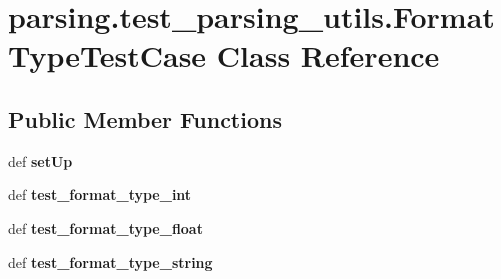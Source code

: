 \hypertarget{classparsing_1_1test__parsing__utils_1_1_format_type_test_case}{\section{parsing.\-test\-\_\-parsing\-\_\-utils.\-Format\-Type\-Test\-Case \-Class \-Reference}
\label{classparsing_1_1test__parsing__utils_1_1_format_type_test_case}
}
\subsection*{\-Public \-Member \-Functions}
\begin{DoxyCompactItemize}
\item 
\hypertarget{classparsing_1_1test__parsing__utils_1_1_format_type_test_case_a6be1e74faa339a45774884b5d8eddc33}{def {\bfseries set\-Up}}\label{classparsing_1_1test__parsing__utils_1_1_format_type_test_case_a6be1e74faa339a45774884b5d8eddc33}

\item 
\hypertarget{classparsing_1_1test__parsing__utils_1_1_format_type_test_case_ae197beff11e5da078f3f8632f9a9c687}{def {\bfseries test\-\_\-format\-\_\-type\-\_\-int}}\label{classparsing_1_1test__parsing__utils_1_1_format_type_test_case_ae197beff11e5da078f3f8632f9a9c687}

\item 
\hypertarget{classparsing_1_1test__parsing__utils_1_1_format_type_test_case_a1332766400630edd2a72aff163f0236d}{def {\bfseries test\-\_\-format\-\_\-type\-\_\-float}}\label{classparsing_1_1test__parsing__utils_1_1_format_type_test_case_a1332766400630edd2a72aff163f0236d}

\item 
\hypertarget{classparsing_1_1test__parsing__utils_1_1_format_type_test_case_afb4c837b8f17d75fc35b163e0644e6f0}{def {\bfseries test\-\_\-format\-\_\-type\-\_\-string}}\label{classparsing_1_1test__parsing__utils_1_1_format_type_test_case_afb4c837b8f17d75fc35b163e0644e6f0}

\end{DoxyCompactItemize}
